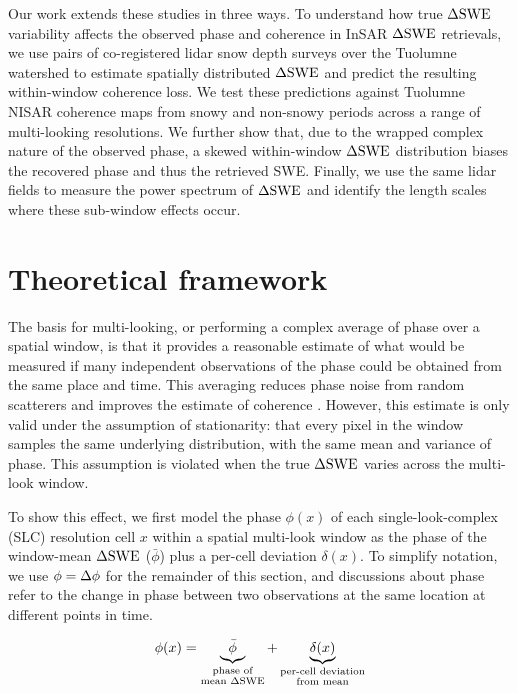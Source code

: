 \documentclass[journal abbreviation, manuscript]{copernicus}
\begin{document}
Our work extends these studies in three ways. To understand how true $\Delta\mathrm{SWE}$ variability affects the observed phase and coherence in InSAR $\Delta\mathrm{SWE}$ retrievals, we use pairs of co-registered lidar snow depth surveys over the Tuolumne watershed to estimate spatially distributed $\Delta\mathrm{SWE}$ and predict the resulting within-window coherence loss. We test these predictions against Tuolumne NISAR coherence maps from snowy and non-snowy periods across a range of multi-looking resolutions. We further show that, due to the wrapped complex nature of the observed phase, a skewed within-window $\Delta\mathrm{SWE}$ distribution biases the recovered phase and thus the retrieved SWE. Finally, we use the same lidar fields to measure the power spectrum of $\Delta\mathrm{SWE}$ and identify the length scales where these sub-window effects occur.

\section{Theoretical framework}\label{sec:theoretical-framework}

The basis for multi-looking, or performing a complex average of phase over a spatial window, is that it provides a reasonable estimate of what would be measured if many independent observations of the phase could be obtained from the same place and time. This averaging reduces phase noise from random scatterers and improves the estimate of coherence \citep{Bamler1998}. However, this estimate is only valid under the assumption of stationarity: that every pixel in the window samples the same underlying distribution, with the same mean and variance of phase. This assumption is violated when the true $\Delta\mathrm{SWE}$ varies across the multi-look window.

To show this effect, we first model the phase $\phi (x)$ of each single-look-complex (SLC) resolution cell $x$ within a spatial multi-look window as the phase of the window-mean $\Delta\mathrm{SWE}$ ($\bar{\phi}$) plus a per-cell deviation $\delta (x)$. To simplify notation, we use $\phi = \Delta\phi$ for the remainder of this section, and discussions about phase refer to the change in phase between two observations at the same location at different points in time.

\begin{equation}\label{eq:sigma_def}
      \phi (x) = \underbrace{\bar{\phi}}_{\substack{\text{phase of} \\ \text{mean $\Delta\mathrm{SWE}$}}}
           + \underbrace{\delta (x)}_{\substack{\text{per-cell deviation} \\ \text{from mean}}}
\end{equation}
\end{document}
